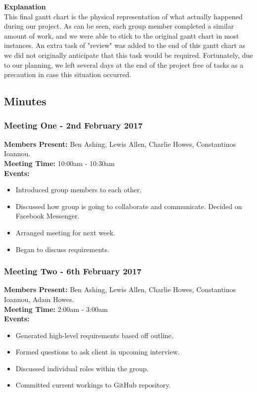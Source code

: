 \documentclass[a4paper]{article}
\begin{document}
\begin{landscape}
\textbf{Explanation} \\
This final gantt chart is the physical representation of what actually happened during our project. As can be seen, each group member completed a similar amount of work, and we were able to stick to the original gantt chart in most instances. An extra task of "review" was added to the end of this gantt chart as we did not originally anticipate that this task would be required. Fortunately, due to our planning, we left several days at the end of the project free of tasks as a precaution in case this situation occurred.

\end{landscape}

\subsection{Minutes} %
\subsubsection*{Meeting One - 2nd February 2017}
\textbf{Members Present:} Ben Ashing, Lewis Allen, Charlie Howes, Constantinos Ioannou. \\
\textbf{Meeting Time:} 10:00am - 10:30am \\
\textbf{Events:} 
\begin{itemize}
    \item Introduced group members to each other.
    \item Discussed how group is going to collaborate and communicate. Decided on Facebook Messenger.
    \item Arranged meeting for next week.
    \item Began to discuss requirements.
\end{itemize}

\subsubsection*{Meeting Two - 6th February 2017}
\textbf{Members Present:} Ben Ashing, Lewis Allen, Charlie Howes, Constantinos Ioannou, Adam Howes. \\
\textbf{Meeting Time:} 2:00am - 3:00am \\
\textbf{Events:} 
\begin{itemize}
    \item Generated high-level requirements based off outline.
    \item Formed questions to ask client in upcoming interview.
    \item Discussed individual roles within the group.
    \item Committed current workings to GitHub repository.
\end{itemize}
\end{document}
